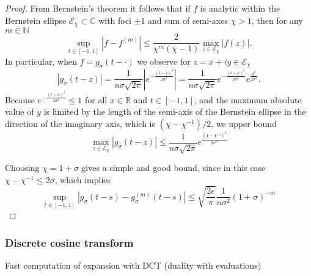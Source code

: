 \documentclass[12pt]{article}
\begin{document}
\begin{proof}
    From Bernstein's theorem \cite[Theorem 4.3]{trefethen-2008-gauss-quadrature} it follows that if $f$ is analytic within the Bernstein ellipse $\mathcal{E}_{\chi} \subset \mathbb{C}$ with foci $\pm 1$ and sum of semi-axes $\chi > 1$, then for any $m \in \mathbb{N}$
    \begin{equation}
        \sup_{t \in [-1, 1]} \left| f - f^{(m)} \right| \leq \frac{2}{\chi^m (\chi - 1)} \max_{z \in \mathcal{E}_{\chi}} |f(z)|.
        \label{equ:bernstein-bound}
    \end{equation}
    In particular, when $f = g_{\sigma}(t - \cdot)$ we observe for $z = x + iy \in \mathcal{E}_{\chi}$
    \begin{equation}
    | g_{\sigma}(t - z) | 
    = \frac{1}{n \sigma \sqrt{2 \pi}} \left| e^{-\frac{(t - z)^2}{2\sigma^2}} \right|
    = \frac{1}{n \sigma \sqrt{2 \pi}} e^{-\frac{(t - x)^2}{2\sigma^2}}e^{\frac{y^2}{2\sigma^2}}.
    \end{equation}
    Because $e^{-\frac{(t - x)^2}{2\sigma^2}} \leq 1$ for all $x \in \mathbb{R}$ and $t \in [-1,1]$, and the maximum absolute value of $y$ is limited by the length of the semi-axis of the Bernstein ellipse in the direction of the imaginary axis, which is $(\chi - \chi^{-1}) / 2$, we upper bound
    \begin{equation}
        \max_{z \in \mathcal{E}_{\chi}} | g_{\sigma}(t - z) | 
        \leq \frac{1}{n \sigma \sqrt{2 \pi}} e^{\frac{(\chi - \chi^{-1})^2}{8 \sigma^2}} 
    \end{equation}

    Choosing $\chi = 1 + \sigma$ gives a simple and good bound, since in this case $\chi - \chi^{-1} \leq 2\sigma$, which implies
    \begin{equation}
        \sup_{t \in [-1, 1]} \left| g_{\sigma}(t - s) - g_{\sigma}^{(m)}(t - s) \right| \leq \sqrt{\frac{2e}{\pi}} \frac{1}{n \sigma^2} (1 + \sigma)^{-m}
    \end{equation}
\end{proof}

\subsubsection{Discrete cosine transform}
\label{subsubsec:dct}

Fast computation of expansion with DCT (duality with evaluations)
\end{document}
